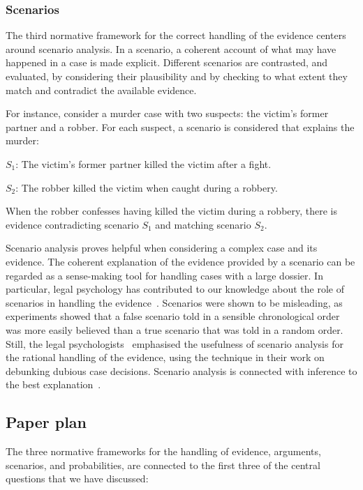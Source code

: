\documentclass[10pt]{article}
\begin{document}
\subsubsection{Scenarios}
\label{sec:introScen}
The third normative framework for the correct handling of the evidence centers around scenario analysis. In a scenario, a coherent account of what may have happened in a case is made explicit. Different scenarios are contrasted, and evaluated, by considering their plausibility and by checking to what extent they match and contradict the available evidence. 

For instance, consider a murder case with two suspects: the victim's former partner and a robber. For each suspect, a scenario is considered that explains the murder:

\begin{description}
	\item $S_1$: The victim's former partner killed the victim after a fight.
	\item $S_2$: The robber killed the victim when caught during a robbery.	
\end{description}

\noindent When the robber confesses having killed the victim during a robbery, there is evidence contradicting scenario $S_1$ and matching scenario $S_2$.

Scenario analysis proves helpful when considering a complex case and its evidence. The coherent explanation of the evidence provided by a scenario can be regarded as a sense-making tool for handling cases with a large dossier. In particular, legal psychology has contributed to our knowledge about the role of scenarios in handling the evidence~\citep{bennettFeldman1981,penningtonHastie1993}. Scenarios were shown to be misleading, as experiments showed that a false scenario told in a sensible chronological order was more easily believed than a true scenario that was told in a random order. Still, the legal psychologists~\citet{wagenaarEtal1993} emphasised the usefulness of scenario analysis for the rational handling of the evidence, using the technique in their work on debunking dubious case decisions. Scenario analysis is connected with inference to the best explanation~\citep{pardoAllen2008}.

\subsection{Paper plan}

The three normative frameworks for the handling of evidence, arguments, scenarios, and probabilities, are connected to the first three of the central questions that we have discussed:
\end{document}

